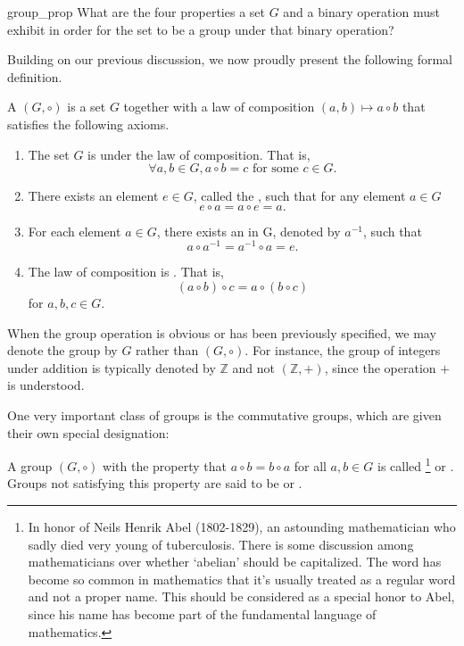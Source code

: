 \begin{exercise}{group_prop}
What are the four properties a set $G$ and a binary operation must exhibit in order for the set to be a group under that binary operation?
\end{exercise}
Building on our previous discussion, we now  proudly present the following formal definition.

\begin{defn}\label{group_definition}
 A  $(G, \circ )$ is a set $G$ together with a law of composition $(a,b) \mapsto a \circ b$ that satisfies the following axioms. 
\begin{enumerate}
\item
The set $G$ is  under the law of composition.  That is, 
\[
\forall a,b \in G, a \circ b = c \mbox{ for some } c \in G .
\]
\item
There exists an element $e \in G$, called the , such that for any element $a \in G$ 
\[
e \circ a = a \circ e = a.
\]
\item
For each element $a \in G$, there exists an  in G, denoted by $a^{-1}$, such that 
\[
a \circ a^{-1} = a^{-1} \circ a = e.
\]
\item
The law of composition is . That is,
\[
(a \circ b) \circ c = a \circ (b \circ c)
\]
for $a, b, c \in G$.
 
\end{enumerate}
\end{defn}

\begin{rem}
When the group operation is obvious or has been previously specified, we may denote the group by $G$ rather than $(G,\circ)$.  For instance, the group of integers under addition is typically denoted by ${\mathbb Z}$ and not $({\mathbb Z},+)$, since the operation $+$ is understood. 
\end{rem}

One very important class of groups is the commutative groups, which are given their own special designation:

\begin{defn} \label{abelian_group} 
A group $(G,\circ)$ with the property that $a \circ b = b \circ a$ for all $a, b \in G$ is called \footnote{In honor of Neils Henrik Abel (1802-1829), an astounding mathematician who sadly died very young of tuberculosis. There is some discussion among mathematicians over whether `abelian' should be capitalized. The word has become so common in mathematics that it's usually treated as a regular word and not a proper name. This should be considered as a special honor to Abel, since his name has become part of the fundamental language of mathematics.}  or .  Groups not satisfying this property are said to be   or . 
\end{defn}

